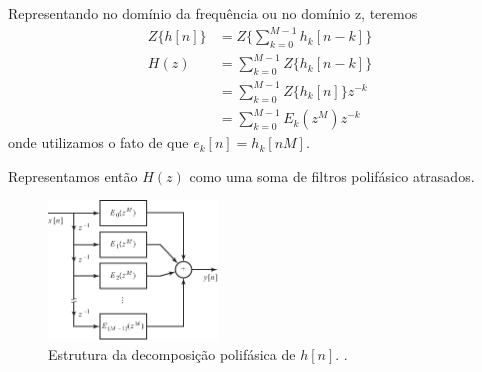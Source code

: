 \begin{frame}[allowframebreaks]
  \framebreak

  Representando no domínio da frequência ou no domínio z, teremos
  \begin{align}
   Z\{ h[n] \} &= Z\{  \sum_{k=0}^{M-1} h_k [n-k] \} \\
          H(z) &= \sum_{k=0}^{M-1} Z\{ h_k [n-k] \} \\
               &= \sum_{k=0}^{M-1} Z\{ h_k [n] \} z^{-k} \\
               &= \sum_{k=0}^{M-1} E_k(z^M) z^{-k}
  \end{align}
  onde utilizamos o fato de que $e_k[n]=h_k[nM]$.

  \framebreak 

  Representamos então $H(z)$ como uma soma de filtros polifásico atrasados.


        \begin{figure}[h!]
        \centering
        \includegraphics[width=0.4\textwidth]{images/fig437.pdf}
        \caption{Estrutura da decomposição polifásica de $h[n]$. \citep{oppenheim2009}.}
        \label{fig:fig437}
        \end{figure}
\end{frame}


